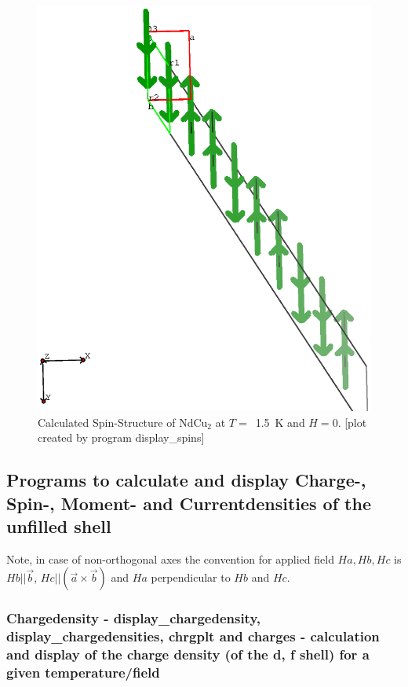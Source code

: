 \begin{figure}[hb]%
\begin{center}\leavevmode
\includegraphics[angle=0, width=1.0\textwidth]{figsrc/ndcu2b/resultss/spinsab.eps}
\end{center}
\caption{Calculated Spin-Structure of NdCu$_2$ at $T=$~1.5~K and $H=0$.
[plot created by program {\prg display\_spins}]}
\label{spingraphic}
\end{figure}

\subsection{Programs to calculate and display Charge-, Spin-, Moment- and Currentdensities
of the unfilled shell}
                          Note, in case of non-orthogonal axes the convention 
                           for applied field $Ha, Hb,Hc$ 
                            is $Hb||\vec b$, $Hc||(\vec a \times \vec b)$ and $Ha$ perpendicular to $Hb$ and $Hc$.

\subsubsection{Chargedensity - {\prg display\_chargedensity},
{\prg display\_chargedensities},
{\prg chrgplt} and  {\prg charges} - calculation and display of
the charge density (of the d, f shell) for a given temperature/field}
\label{charges}

